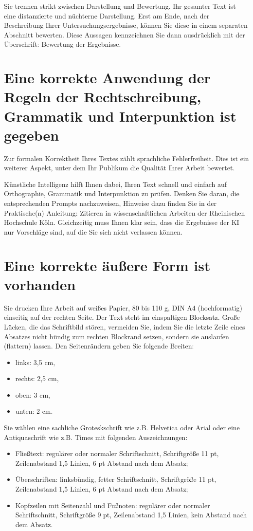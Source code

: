 Sie trennen strikt zwischen Darstellung und Bewertung. Ihr gesamter Text ist eine distanzierte und nüchterne Darstellung. Erst am Ende, nach der Beschreibung Ihrer Untersuchungsergebnisse, können Sie diese in einem separaten Abschnitt bewerten. Diese Aussagen kennzeichnen Sie dann ausdrücklich mit der Überschrift: Bewertung der Ergebnisse.

\section{Eine korrekte Anwendung der Regeln der Rechtschreibung, Grammatik und Interpunktion ist gegeben}
\label{sec:rechtschreibung}

Zur formalen Korrektheit Ihres Textes zählt sprachliche Fehlerfreiheit. Dies ist ein weiterer Aspekt, unter dem Ihr Publikum die Qualität Ihrer Arbeit bewertet.

Künstliche Intelligenz hilft Ihnen dabei, Ihren Text schnell und einfach auf Orthographie, Grammatik und Interpunktion zu prüfen. Denken Sie daran, die entsprechenden Prompts nachzuweisen, Hinweise dazu finden Sie in der Praktische(n) Anleitung: Zitieren in wissenschaftlichen Arbeiten der Rheinischen Hochschule Köln. Gleichzeitig muss Ihnen klar sein, dass die Ergebnisse der KI nur Vorschläge sind, auf die Sie sich nicht verlassen können.

\section{Eine korrekte äußere Form ist vorhanden}
\label{sec:aeuszere-form}

Sie drucken Ihre Arbeit auf weißes Papier, 80 bis 110 g, DIN A4 (hochformatig) einseitig auf der rechten Seite. Der Text steht im einspaltigen Blocksatz. Große Lücken, die das Schriftbild stören, vermeiden Sie, indem Sie die letzte Zeile eines Absatzes nicht bündig zum rechten Blockrand setzen, sondern sie auslaufen (flattern) lassen. Den Seitenrändern geben Sie folgende Breiten:
\begin{itemize}[label={--}]
\item links: 3,5 cm,
\item rechts: 2,5 cm,
\item oben: 3 cm,
\item unten: 2 cm.
\end{itemize}

Sie wählen eine sachliche Groteskschrift wie z.B. Helvetica oder Arial oder eine Antiquaschrift wie z.B. Times mit folgenden Auszeichnungen:
\begin{itemize}[label={--}]
\item Fließtext: regulärer oder normaler Schriftschnitt, Schriftgröße 11 pt, Zeilenabstand 1,5 Linien, 6 pt Abstand nach dem Absatz;
\item Überschriften: linksbündig, fetter Schriftschnitt, Schriftgröße 11 pt, Zeilenabstand 1,5 Linien, 6 pt Abstand nach dem Absatz;
\item Kopfzeilen mit Seitenzahl und Fußnoten: regulärer oder normaler Schriftschnitt, Schriftgröße 9 pt, Zeilenabstand 1,5 Linien, kein Abstand nach dem Absatz.
\end{itemize}

